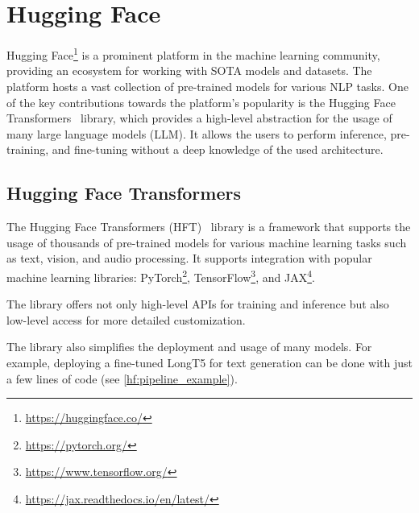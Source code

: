 \documentclass[english, ba, kiv, he, iso690numb, pdf, viewonly]{fasthesis}
\begin{document}
	\section{Hugging Face} \label{hf}
	Hugging Face\footnote{\url{https://huggingface.co/}} is a prominent platform in the machine learning community, providing an ecosystem for working with SOTA models and datasets. The platform hosts a vast collection of pre-trained models for various NLP tasks. One of the key contributions towards the platform's popularity is the Hugging Face Transformers~\cite{wolf-etal-2020-transformers} library, which provides a high-level abstraction for the usage of many large language models (LLM). It allows the users to perform inference, pre-training, and fine-tuning without a deep knowledge of the used architecture. 
	\subsection{Hugging Face Transformers}
	The Hugging Face Transformers (HFT)~\cite{wolf-etal-2020-transformers} library is a framework that supports the usage of thousands of pre-trained models for various machine learning tasks such as text, vision, and audio processing. It supports integration with popular machine learning libraries: PyTorch\footnote{\url{https://pytorch.org/}}, TensorFlow\footnote{\url{https://www.tensorflow.org/}}, and JAX\footnote{\url{https://jax.readthedocs.io/en/latest/}}.
	
	The library offers not only high-level APIs for training and inference but also low-level access for more detailed customization.
	
	The library also simplifies the deployment and usage of many models. For example, deploying a fine-tuned LongT5 for text generation can be done with just a few lines of code (see \ref{hf:pipeline_example}).
	
\end{document}
